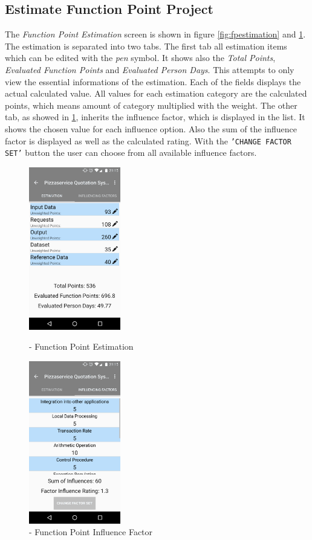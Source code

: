 \subsection{Estimate Function Point Project}

The \textit{Function Point Estimation} screen is shown in figure \ref{fig:fpestimation} and \ref{fig:fpestimation2}. The estimation is separated into two tabs. The first tab all estimation items which can be edited with the \textit{pen} symbol. It shows also the \textit{Total Points}, \textit{Evaluated Function Points} and \textit{Evaluated Person Days}. This attempts to only view the essential informations of the estimation. Each of the fields displays the actual calculated value. All values for each estimation category are the calculated points, which means amount of category multiplied with the weight. The other tab, as showed in \ref{fig:fpestimation2}, inherits the influence factor, which is displayed in the list. It shows the chosen value for each influence option. Also the sum of the influence factor is displayed as well as the calculated rating. With the \texttt{'CHANGE FACTOR SET'} button the user can choose from all available influence factors. 
\begin{figure}[htb]
	\centering
	\begin{minipage}[t]{0.45\linewidth}
		\centering 
		\includegraphics[width=4cm]{images/FPEstimation.png} 
		\caption{- Function Point Estimation} 
		\label{fig:fpestimation}
	\end{minipage}%
	\hfill
	\begin{minipage}[t]{0.45\linewidth}
		\centering 
		\includegraphics[width=4cm]{images/FPInfluence.png} 
		\caption{- Function Point Influence Factor} 
		\label{fig:fpestimation2}
	\end{minipage}
\end{figure}


